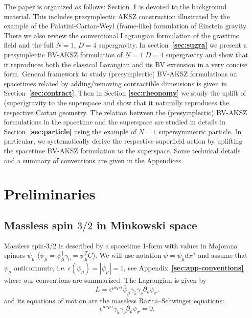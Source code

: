 \documentclass[a4paper,12pt]{article}
\numberwithin{equation}{section} %
\newcommand{\bref}[1]{\textbf{\ref{#1}}}
\newcommand{\p}[1]{|#1|}
\numberwithin{equation}{section}
\begin{document}
The paper is organized as follows: Section~\bref{sec:prelim} is devoted to the background material. This includes presymplectic AKSZ construction illustrated by the example of the Palatini-Cartan-Weyl (frame-like) formulation of Einstein gravity. There we also review the conventional Lagrangian formulation of the gravitino field and the full $N=1$, $D=4$ supergravity. In section~\bref{sec:sugra} we present a presymplectic BV-AKSZ formulation of $N=1$ $D=4$ supergravity and show that it reproduces both the classical Larangian and its BV extension in a very concise form. General framework to study (presymplectic) BV-AKSZ formulations on spacetimes related by adding/removing contractible dimensions is given in Section~\bref{sec:contract}. Then in Section \bref{sec:rheonomy} we study the uplift of (super)gravity to the superspace and show that it naturally reproduces the respective Cartan geometry. The relation between the (presymplectic) BV-AKSZ formulations in the spacetime and the superspace are studied in details in Section~\bref{sec:particle} using the example of $N=1$ supersymmetric particle. In particular, we systematically derive the respective superfield action by uplifting the spacetime BV-AKSZ formulation to the superspace. Some technical details and a summary of conventions are given in the Appendices.  


\section{Preliminaries}
\label{sec:prelim}
\subsection{Massless spin $3/2$ in Minkowski space}
Massless spin-$3/2$ is described by a spacetime  1-form with values in Majorana spinors $\psi_\mu$ ($\overline{\psi_\mu} = \psi_\mu^\dagger \gamma_0 = \psi_\mu^T C$). We will use notation $\psi = \psi_\mu dx^\mu$ and assume that $\psi_\mu$ anticommute, i.e. $\epsilon(\psi_\mu) =\p{\psi_\mu}=1$, see Appendix~\bref{sec:app-conventions} where our conventions are summarized. The Lagrangian is given by 
\begin{equation}
    L = \epsilon^{\mu\nu\rho\sigma} \overline{\psi}_\mu \gamma_5 \gamma_\nu \partial_\rho \psi_\sigma.
\end{equation}
and its equations of motion are the massless Rarita–Schwinger equations:
\begin{equation}
    \epsilon^{\mu\nu\rho\sigma} \gamma_5 \gamma_\nu \partial_\rho \psi_\sigma = 0.
\end{equation}
\end{document}

